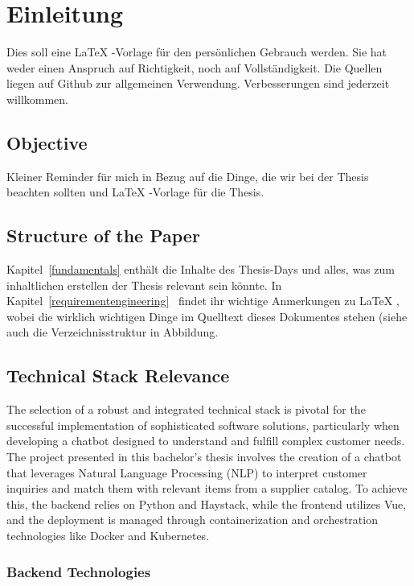 \section{Einleitung}
Dies soll eine \LaTeX{}
-Vorlage für den persönlichen Gebrauch werden.
Sie hat weder einen Anspruch auf Richtigkeit, noch auf Vollständigkeit.
Die Quellen liegen auf Github zur allgemeinen Verwendung.
Verbesserungen sind jederzeit willkommen.

\subsection{Objective}
Kleiner Reminder für mich in Bezug auf die Dinge, die wir bei der Thesis beachten sollten und \LaTeX{}
-Vorlage für die Thesis.

\subsection{Structure of the Paper}
Kapitel~\ref{fundamentals}
enthält die Inhalte des Thesis-Days und alles, was zum inhaltlichen erstellen der Thesis relevant sein könnte.
In
Kapitel~\ref{requirementengineering}~ findet ihr wichtige Anmerkungen zu \LaTeX{}
, wobei die wirklich wichtigen Dinge im Quelltext dieses Dokumentes stehen (siehe auch die Verzeichnisstruktur in
Abbildung.

\subsection{Technical Stack Relevance}

The selection of a robust and integrated technical stack is pivotal for the successful implementation of sophisticated
software solutions, particularly when developing a chatbot designed to understand and fulfill complex customer needs.
The project presented in this bachelor’s thesis involves the creation of a chatbot that leverages Natural Language
Processing (NLP) to interpret customer inquiries and match them with relevant items from a supplier catalog.
To achieve
this, the backend relies on Python and Haystack, while the frontend utilizes Vue, and the deployment is
managed through containerization and orchestration technologies like Docker and Kubernetes.

\subsubsection{Backend Technologies}

